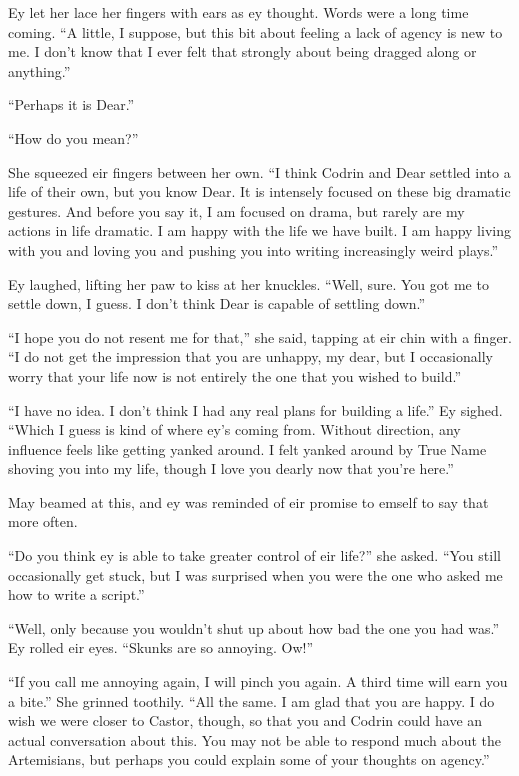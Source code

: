 Ey let her lace her fingers with ears as ey thought. Words were a long time coming. ``A little, I suppose, but this bit about feeling a lack of agency is new to me. I don't know that I ever felt that strongly about being dragged along or anything.''

``Perhaps it is Dear.''

``How do you mean?''

She squeezed eir fingers between her own. ``I think Codrin and Dear settled into a life of their own, but you know Dear. It is intensely focused on these big dramatic gestures. And before you say it, I am focused on drama, but rarely are my actions in life dramatic. I am happy with the life we have built. I am happy living with you and loving you and pushing you into writing increasingly weird plays.''

Ey laughed, lifting her paw to kiss at her knuckles. ``Well, sure. You got me to settle down, I guess. I don't think Dear is capable of settling down.''

``I hope you do not resent me for that,'' she said, tapping at eir chin with a finger. ``I do not get the impression that you are unhappy, my dear, but I occasionally worry that your life now is not entirely the one that you wished to build.''

``I have no idea. I don't think I had any real plans for building a life.'' Ey sighed. ``Which I guess is kind of where ey's coming from. Without direction, any influence feels like getting yanked around. I felt yanked around by True Name shoving you into my life, though I love you dearly now that you're here.''

May beamed at this, and ey was reminded of eir promise to emself to say that more often.

``Do you think ey is able to take greater control of eir life?'' she asked. ``You still occasionally get stuck, but I was surprised when you were the one who asked me how to write a script.''

``Well, only because you wouldn't shut up about how bad the one you had was.'' Ey rolled eir eyes. ``Skunks are so annoying. Ow!''

``If you call me annoying again, I will pinch you again. A third time will earn you a bite.'' She grinned toothily. ``All the same. I am glad that you are happy. I do wish we were closer to Castor, though, so that you and Codrin could have an actual conversation about this. You may not be able to respond much about the Artemisians, but perhaps you could explain some of your thoughts on agency.''

